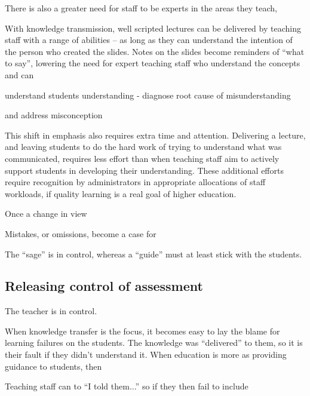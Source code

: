There is also a greater need for staff to be experts in the areas they teach,

With knowledge transmission, well scripted lectures can be delivered by teaching staff with a range of abilities -- as long as they can understand the intention of the person who created the slides. Notes on the slides become reminders of ``what to say'', lowering the need for expert teaching staff who understand the concepts and can 

understand students understanding - diagnose root cause of misunderstanding 

and address misconception

This shift in emphasis also requires extra time and attention. Delivering a lecture, and leaving students to do the hard work of trying to understand what was communicated, requires less effort than when teaching staff aim to actively support students in developing their understanding. These additional efforts require recognition by administrators in appropriate allocations of staff workloads, if quality learning is a real goal of higher education.

Once a change in view

Mistakes, or omissions, become a case for  


 

 The ``sage'' is in control, whereas a ``guide'' must at least stick with the students.


\subsection{Releasing control of assessment} %
\label{sub:releasing_control_of_assessment}

The teacher is in control.

When knowledge transfer is the focus, it becomes easy to lay the blame for learning failures on the students. The knowledge was ``delivered'' to them, so it is their fault if they didn't understand it. When education is more as providing guidance to students, then 

Teaching staff can to  ``I told them...'' so if they then fail to include 









